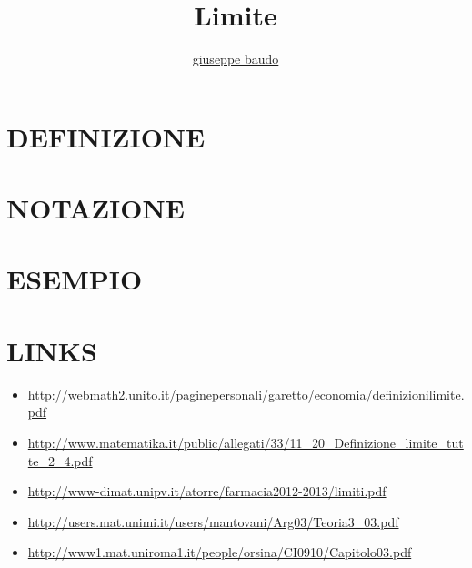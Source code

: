 \documentclass[a4paper,10pt]{article}
\title{Limite}
\author{\href{http://www.baudo.hol.es}{giuseppe baudo}}
\begin{document}
\maketitle

\section{DEFINIZIONE}

\section{NOTAZIONE}

\section{ESEMPIO}

\section{LINKS}
\begin{itemize}
 \item \url{http://webmath2.unito.it/paginepersonali/garetto/economia/definizionilimite.pdf}
 \item \url{http://www.matematika.it/public/allegati/33/11_20_Definizione_limite_tutte_2_4.pdf}
 \item \url{http://www-dimat.unipv.it/atorre/farmacia2012-2013/limiti.pdf}
 \item \url{http://users.mat.unimi.it/users/mantovani/Arg03/Teoria3_03.pdf}
 \item \url{http://www1.mat.uniroma1.it/people/orsina/CI0910/Capitolo03.pdf}
\end{itemize}
\end{document}
